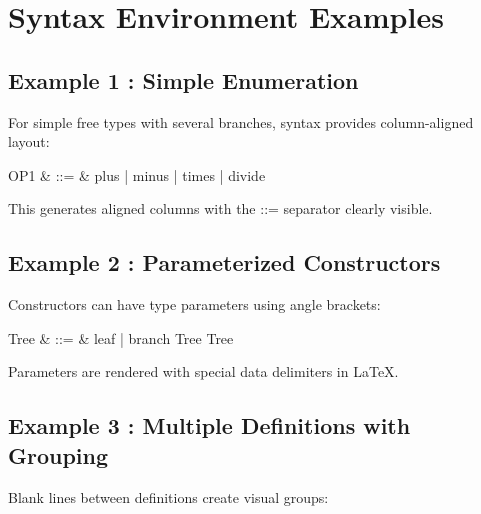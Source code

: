 \documentclass[a4paper,10pt,fleqn]{article}
\begin{document}
\section*{Syntax Environment Examples}

\begin{zed}
[NAME]
\end{zed}

\subsection*{Example 1 : Simple Enumeration}

\noindent For simple free types with several branches, syntax provides column-aligned layout:

\bigskip

\begin{syntax}
OP1 & ::= & plus | minus | times | divide
\end{syntax}

\noindent This generates aligned columns with the ::= separator clearly visible.

\bigskip

\subsection*{Example 2 : Parameterized Constructors}

\noindent Constructors can have type parameters using angle brackets:

\bigskip

\begin{syntax}
Tree & ::= & leaf \ldata \nat \rdata | branch \ldata Tree \cross Tree \rdata
\end{syntax}

\noindent Parameters are rendered with special data delimiters in LaTeX.

\bigskip

\subsection*{Example 3 : Multiple Definitions with Grouping}

\noindent Blank lines between definitions create visual groups:
\end{document}
